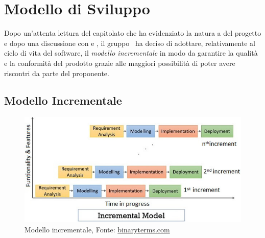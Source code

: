 \section{Modello di Sviluppo}
\label{modello_di_sviluppo}
Dopo un'attenta lettura del capitolato che ha evidenziato la natura a  del progetto e dopo una discussione con \Proponente e , il gruppo \Gruppo\ ha deciso di adottare, relativamente al ciclo di vita del software, il \textit{modello incrementale} in modo da garantire la qualità e la conformità del prodotto grazie alle maggiori possibilità di poter avere riscontri da parte del proponente. 

\subsection{Modello Incrementale}

\begin{figure}[ht]
    \centering
    \includegraphics[width=\textwidth]{../../Immagini/ModelloIncrementale}
    \caption{Modello incrementale, Fonte: \href{https://binaryterms.com/incremental-development-model.html}{binaryterms.com}}
    \label{fig:modello_incrementale}
\end{figure}

